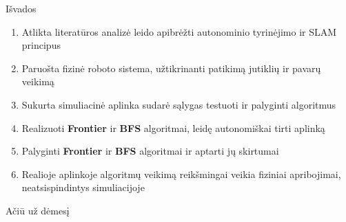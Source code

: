 \documentclass[12pt]{beamer}
\begin{document}
\begin{frame}{Išvados}
    \begin{enumerate}
        \item Atlikta literatūros analizė leido apibrėžti autonominio tyrinėjimo ir SLAM principus
        \item Paruošta fizinė roboto sistema, užtikrinanti patikimą jutiklių ir pavarų veikimą
        \item Sukurta simuliacinė aplinka sudarė sąlygas testuoti ir palyginti algoritmus
        \item Realizuoti \textbf{Frontier} ir \textbf{BFS} algoritmai, leidę autonomiškai tirti aplinką
        \item Palyginti \textbf{Frontier} ir \textbf{BFS} algoritmai ir aptarti jų skirtumai
        \item Realioje aplinkoje algoritmų veikimą reikšmingai veikia fiziniai apribojimai, neatsispindintys simuliacijoje
    \end{enumerate}
\end{frame}

\begin{frame}
    \begin{center}
        \Huge Ačiū už dėmesį
    \end{center}
\end{frame}
\end{document}
